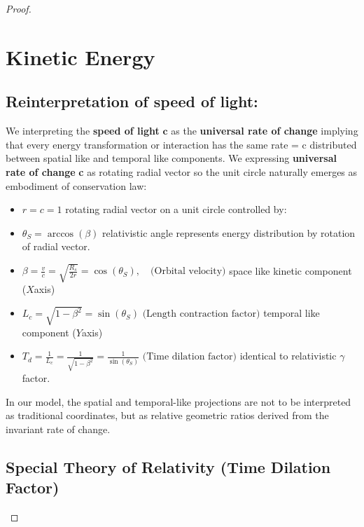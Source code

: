 \documentclass{article}
\begin{document}
\begin{proof}
\section{Kinetic Energy}

\subsection{Reinterpretation of speed of light:}

We interpreting the \textbf{speed of light} $\textbf{c}$ as the \textbf{universal rate of change} implying that every energy transformation or interaction has the same rate = c distributed  between spatial like and temporal like components. We expressing \textbf{universal rate of change}\textbf{ c} as rotating radial vector so the unit circle naturally emerges as embodiment of conservation law:

\begin{itemize}
    \item \textbf{$r=c = 1$} rotating radial vector on a unit circle controlled by:
    \item \textbf{$\theta_S = \arccos(\beta)$} relativistic angle represents energy distribution by rotation of radial vector.
\end{itemize}
\begin{itemize}
    \item  \textbf{$ \beta =  \frac{v}{c} = \sqrt{\frac{R_s}{2r}} =  \cos\left(\theta_S\right), \quad \text{(Orbital velocity)}$} space like kinetic component ($X$axis) 
\end{itemize}
    \begin{itemize}
        \item   $L_c =\sqrt{1-\beta^2} =\sin(\theta_S)\text{ (Length contraction factor)}$ temporal like component  ($Y$axis) 
        \item $T_d =\frac{1}{L_c}=\frac{1}{\sqrt{1-\beta^2} }=\frac{1}{\sin(\theta_S)}\text{ (Time dilation factor)}$ identical to relativistic $\gamma$ factor.
    \end{itemize}

In our model, the spatial and temporal-like projections are not to be interpreted as traditional coordinates, but as relative geometric ratios derived from the invariant rate of change. 

\subsection{Special Theory of Relativity (Time Dilation Factor)}


\end{proof}
\end{document}
